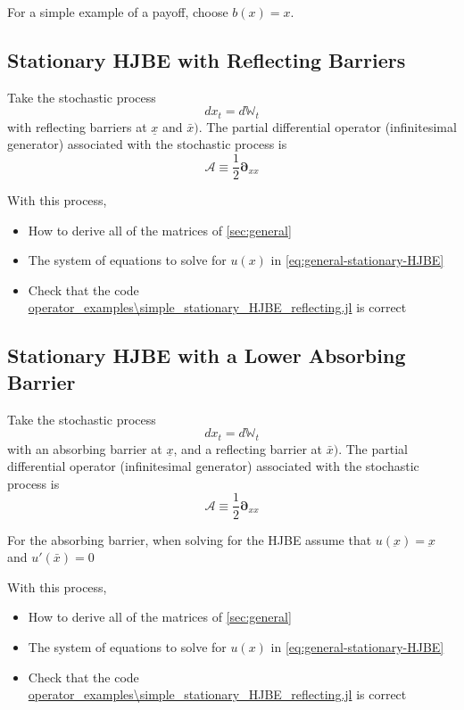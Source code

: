 \documentclass[11pt]{article}
\newcommand{\D}[1][]{\ensuremath{\boldsymbol{\partial}_{#1}}}
\newcommand{\W}{\ensuremath{\mathbb{W}}}
\newcommand{\A}{\ensuremath{\mathcal{A}}}
\begin{document}
For a simple example of a payoff, choose $b(x) = x$.

\subsection{Stationary HJBE with Reflecting Barriers}
Take the stochastic process
$$
d x_t = d \W_t
$$
with reflecting barriers at $\underline{x}$ and $\bar{x})$.  The partial differential operator (infinitesimal generator) associated with the stochastic process is
$$
	\A \equiv \frac{1}{2}\D[xx]
$$

With this process,
\begin{itemize}
	\item How to derive all of the matrices of \cref{sec:general}
	\item The system of equations to solve for $u(x)$ in \cref{eq:general-stationary-HJBE}
	\item Check that the code \url{operator_examples\simple_stationary_HJBE_reflecting.jl} is correct
\end{itemize}

\subsection{Stationary HJBE with a Lower Absorbing Barrier}
Take the stochastic process
$$
d x_t = d \W_t
$$
with an absorbing barrier at $\underline{x}$, and a reflecting barrier at $\bar{x})$.  The partial differential operator (infinitesimal generator) associated with the stochastic process is
$$
\A \equiv \frac{1}{2}\D[xx]
$$

For the absorbing barrier, when solving for the HJBE assume that $u(\underbar{x}) = \underbar{x}$ and $u'(\bar{x}) = 0$


With this process,
\begin{itemize}
	\item How to derive all of the matrices of \cref{sec:general}
	\item The system of equations to solve for $u(x)$ in \cref{eq:general-stationary-HJBE}
	\item Check that the code \url{operator_examples\simple_stationary_HJBE_reflecting.jl} is correct
\end{itemize}
\end{document}
